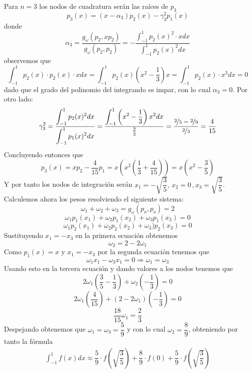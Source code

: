 \begin{ejem}
Para $n=3$ los nodos de cuadratura serán las raíces de $p_3$
$$p_3(x)=(x-\alpha_3)p_2(x)-\gamma_3^2p_1(x)$$
donde
$$\alpha_3=\dfrac{g_{\omega}(p_2,xp_2)}{g_{\omega}(p_2,p_2)}=-\dfrac{\displaystyle\int_{-1}^1p_2(x)^2\cdot x dx}{\displaystyle\int_{-1}^1p_2(x)^2dx}$$
observemos que
$$\int_{-1}^1p_2(x)\cdot p_2(x)\cdot xdx=\int_{-1}^1p_2(x)\left(x^2-\dfrac{1}{3}\right)x=\int_{-1}^1p_2(x)\cdot x^3dx=0$$
dado que el grado del polinomio del integrando es impar, con lo cual $\alpha_3=0$. Por otro lado:
$$\gamma_3^2=\dfrac{\displaystyle\int_{-1}^1p_2(x)^2dx}{\displaystyle\int_{-1}^1p_1(x)^2dx}=\dfrac{\displaystyle \int_{-1}^1\left(x^2-\dfrac{1}{3}\right)x^2dx}{\frac{2}{3}}=\dfrac{\nicefrac{2}{5}-\nicefrac{2}{9}}{\nicefrac{2}{3}}=\dfrac{4}{15}$$
Concluyendo entonces que
$$p_3(x)=xp_2-\dfrac{4}{15}p_1=x\left(x^2\left(\dfrac{1}{3}+\dfrac{4}{15}\right)\right)=x\left(x^2-\dfrac{3}{5}\right)$$
Y por tanto los nodos de integración serán $x_1=-\sqrt{\dfrac{3}{5}},\,x_2=0\, ,x_3=\sqrt{\dfrac{3}{5}}$. Calculemos ahora los pesos resolviendo el siguiente sistema:
$$\omega_1+\omega_2+\omega_3=g_{\omega}(p_o,p_o)=2$$
$$\omega_1p_1(x_1)+\omega_2p_1(x_2)+\omega_3p_1(x_3)=0$$
$$\omega_1p_2(x_1)+\omega_2p_2(x_2)+\omega_3)p_2(x_3)=0$$
Sustituyendo $x_1=-x_3$ en la primera ecuación obtenemos
$$\omega_2=2-2\omega_1$$
Como $p_1(x)=x$ y $x_1=-x_3$ por la segunda ecuación tenemos que 
$$\omega_1x_1-\omega_3x_1=0\Rightarrow\omega_1=\omega_3$$
Usando esto en la tercera ecuación y dando valores a los nodos tenemos que
$$2\omega_1\left(\dfrac{3}{5}-\dfrac{1}{3}\right)+\omega_2\left(-\dfrac{1}{3}\right)=0$$
$$2\omega_1\left(\dfrac{4}{15}\right)+(2-2\omega_1)\left(-\dfrac{1}{3}\right)=0$$
$$\dfrac{18}{15}\omega_1=\dfrac{2}{3}$$
Despejando obtenemos que $\omega_1=\omega_3=\dfrac{5}{9}$ y con lo cual $\omega_2=\dfrac{8}{9}$, obteniendo por tanto la fórmula
\begin{align}
 \int_{-1}^1f(x)dx\approx\dfrac{5}{9}\cdot f\left(\sqrt{\dfrac{3}{5}}\right)+ \dfrac{8}{9}\cdot f(0)+\dfrac{5}{9}\cdot f\left(\sqrt{\dfrac{3}{5}}\right) 
 \label{legendre:3}
\end{align}

\end{ejem}

